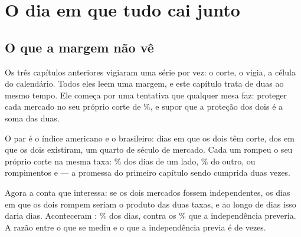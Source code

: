 %
%
%

\chapter{O dia em que tudo cai junto}
\label{cap:dependencia}

\section{O que a margem não vê}

Os três capítulos anteriores vigiaram uma série por vez: o corte, o vigia, a célula do
calendário. Todos eles leem uma margem, e este capítulo trata de duas ao mesmo tempo. Ele começa por uma
tentativa que qualquer mesa faz: proteger cada mercado no seu próprio corte de
\numPromessaPct\%, e supor que a proteção dos dois é a soma das duas.

O par é o índice americano e o brasileiro: \numDependenciaDias{} dias em que os dois têm
corte, dos \numPedacoDiasComuns{} em que os dois existiram, um quarto de século de mercado. Cada um rompeu o seu próprio corte na mesma taxa: \numDependenciaTaxaAPct\% dos dias de um
lado, \numDependenciaTaxaBPct\% do outro, ou \numDependenciaRompeA{} rompimentos e
\numDependenciaRompeB{} --- a promessa do primeiro capítulo sendo cumprida duas vezes.

Agora a conta que interessa: se os dois mercados fossem independentes, os dias em que os dois
rompem seriam o produto das duas taxas, e ao longo de \numDependenciaDias{} dias isso daria
\numDependenciaEsperadoDias{} dias. Aconteceram \numDependenciaJuntos: \numDependenciaJuntosPct\%
dos dias, contra os \numDependenciaEsperadoPct\% que a independência preveria. A razão entre o que se mediu e o que a independência previa é de \numDependenciaExcesso{} vezes.

